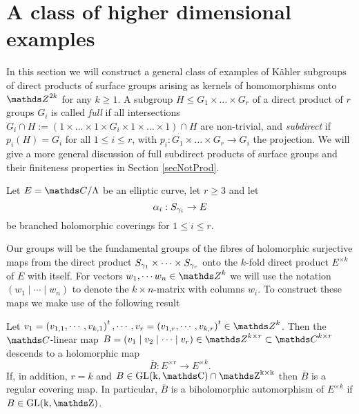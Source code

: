\section{A class of higher dimensional examples}
\label{secExamples}

In this section we will construct a general class of examples of K\"ahler subgroups of direct products of surface groups arising as kernels of homomorphisms onto $\ZZ^{2k}$ for any $k\geq 1$. A subgroup $H\leq G_1 \times \dots \times G_r$ of a direct product of $r$ groups $G_i$ is called \textit{full} if all intersections $G_i\cap H:= \left(1\times \dots \times 1 \times G_i \times 1 \times \dots \times 1\right) \cap H$ are non-trivial, and \textit{subdirect} if $p_i(H)= G_i$ for all $1\leq i \leq r$, with $p_i: G_1 \times \dots \times G_r\to G_i$ the projection. We will give a more general discussion of full subdirect products of surface groups and their finiteness properties in Section \ref{secNotProd}.

Let $E=\CC/\Lambda$ be an elliptic curve, let $r\geq 3$ and let
\[
 \alpha _i: S_{\gamma_i}\rightarrow E
\]
be branched holomorphic coverings for $1\leq i \leq r$. 

Our groups will be the fundamental groups of the fibres of holomorphic surjective maps from the direct product $S_{\gamma_1}\times \cdots \times S_{\gamma_r}$ onto the $k$-fold direct product $E^{\times k}$ of $E$ with itself. For vectors $w_1,\cdots w_n\in \ZZ^k$ we will use the notation $\left(w_1\mid \cdots \mid w_n\right)$ to denote the $k\times n$-matrix with columns $w_i$. To construct these maps we make use of the following result

\begin{lemma}
Let $v_1=\left(v_{1,1},\cdots,v_{k,1}\right)^t,\cdots, v_r=\left(v_{1,r},\cdots,v_{k,r}\right)^t\in \ZZ^k$. Then the $\CC$-linear map $B=(v_1\mid v_2\mid \cdots \mid v_r)\in \ZZ^{k\times r}\subset \CC^{k\times r}$ descends to a holomorphic map
\[
 \overline{B}: E^{\times r}\rightarrow E^{\times k}.
\]
If, in addition, $r=k$ and $B\in \rm{GL}(k,\CC)\cap \ZZ^{k\times k}$ then $\overline{B}$ is a regular covering map. In particular, $\overline{B}$ is a biholomorphic automorphism of $E^{\times k}$ if $B\in \rm{GL}(k,\ZZ)$.
\label{lemAutkEll}
\end{lemma}

